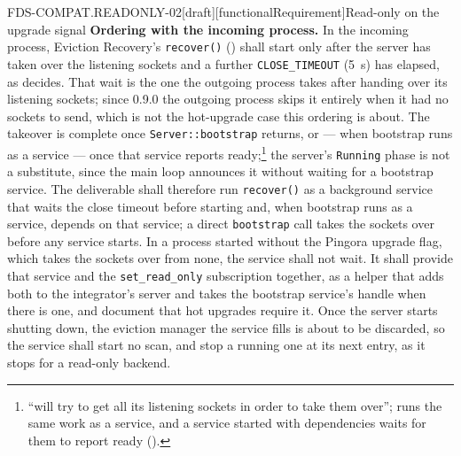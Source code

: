 \begin{requirement}{FDS-COMPAT.READONLY-02}[draft][functionalRequirement]{Read-only on the upgrade signal}
  \textbf{Ordering with the incoming process.} In the incoming process,
  Eviction Recovery's \texttt{recover()} ()
  shall start only after the server has taken over the listening sockets and a
  further \texttt{CLOSE\_TIMEOUT} (5~s) has elapsed, as
   decides. That wait is the one the outgoing
  process takes after handing over its listening sockets; since 0.9.0 the
  outgoing process skips it entirely when it had no sockets to send, which is
  not the hot-upgrade case this ordering is about. The takeover is complete once
  \texttt{Server::bootstrap} returns, or --- when bootstrap runs as a
  service --- once that service reports ready;\footnote{
  ``will try to get all its listening sockets in order to take them over'';
  runs the same work as a service, and a service started with dependencies
  waits for them to report ready
  ().} the server's
  \texttt{Running} phase is not a substitute, since the main loop announces it
  without waiting for a bootstrap service. The deliverable shall therefore
  run \texttt{recover()} as a background service that waits the close
  timeout before starting and, when bootstrap runs as a service, depends on
  that service; a direct \texttt{bootstrap} call takes the sockets over
  before any service starts. In a process started without the Pingora upgrade
  flag, which takes the sockets over from none, the service shall not wait.
  It shall provide that service and the
  \texttt{set\_read\_only} subscription together, as a helper that adds both
  to the integrator's server and takes the bootstrap service's handle when
  there is one, and document that hot upgrades require it. Once the server
  starts shutting down, the eviction manager the service fills is about to
  be discarded, so the service shall start no scan, and stop a running one
  at its next entry, as it stops for a read-only backend.



\end{requirement}


